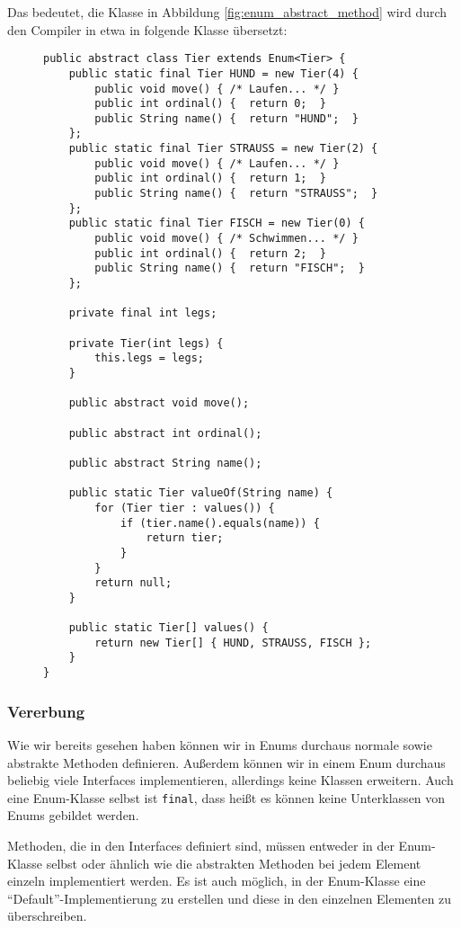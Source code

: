 		Das bedeutet, die Klasse in Abbildung \ref{fig:enum_abstract_method} wird durch den Compiler in etwa in folgende Klasse übersetzt:
		\begin{figure}[H]
			\centering
			\begin{lstlisting}
public abstract class Tier extends Enum<Tier> {
	public static final Tier HUND = new Tier(4) {
		public void move() { /* Laufen... */ }
		public int ordinal() {  return 0;  }
		public String name() {  return "HUND";  }
	};
	public static final Tier STRAUSS = new Tier(2) {
		public void move() { /* Laufen... */ }
		public int ordinal() {  return 1;  }
		public String name() {  return "STRAUSS";  }
	};
	public static final Tier FISCH = new Tier(0) {
		public void move() { /* Schwimmen... */ }
		public int ordinal() {  return 2;  }
		public String name() {  return "FISCH";  }
	};

	private final int legs;

	private Tier(int legs) {
		this.legs = legs;
	}

	public abstract void move();

	public abstract int ordinal();

	public abstract String name();

	public static Tier valueOf(String name) {
		for (Tier tier : values()) {
			if (tier.name().equals(name)) {
				return tier;
			}
		}
		return null;
	}

	public static Tier[] values() {
		return new Tier[] { HUND, STRAUSS, FISCH };
	}
}
\end{lstlisting}
		\end{figure}
	
	\subsubsection{Vererbung}
		Wie wir bereits gesehen haben können wir in Enums durchaus normale sowie abstrakte Methoden definieren. Außerdem können wir in einem Enum durchaus beliebig viele Interfaces implementieren, allerdings keine Klassen erweitern. Auch eine Enum-Klasse selbst ist \lstinline|final|, dass heißt es können keine Unterklassen von Enums gebildet werden.
		
		Methoden, die in den Interfaces definiert sind, müssen entweder in der Enum-Klasse selbst oder ähnlich wie die abstrakten Methoden bei jedem Element einzeln implementiert werden. Es ist auch möglich, in der Enum-Klasse eine \enquote{Default}-Implementierung zu erstellen und diese in den einzelnen Elementen zu überschreiben.

%	
